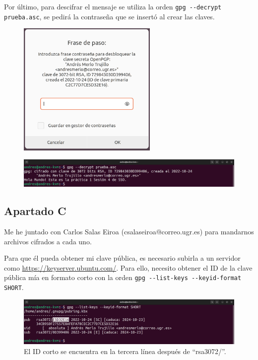 \documentclass{article}
\begin{document}
Por último, para descifrar el mensaje se utiliza la orden \verb|gpg --decrypt prueba.asc|, se pedirá la contraseña que se insertó al crear las claves.

\begin{figure}[H]
    \centering
    \includegraphics[width=0.6\textwidth]{imagenes/Portatil/Captura desde 2022-10-24 12-17-29.png}
\end{figure}

\begin{figure}[H]
    \includegraphics[width=\textwidth]{imagenes/Portatil/Captura desde 2022-10-27 18-35-01.png}
\end{figure}


\subsection*{Apartado C}

Me he juntado con Carlos Salas Eiroa (csalaseiroa@correo.ugr.es) para mandarnos archivos cifrados a cada uno.

Para que él pueda obtener mi clave pública, es necesario subirla a un servidor como \url{https://keyserver.ubuntu.com/}. Para ello, necesito obtener el ID de la clave pública mía en formato corto con la orden \verb|gpg --list-keys --keyid-format SHORT|.


\begin{figure}[H]
    \includegraphics[width=\textwidth]{imagenes/Portatil/Captura desde 2022-10-24 11-54-58.png}
    \caption{El ID corto se encuentra en la tercera línea después de ``rsa3072/''.}
\end{figure}
\end{document}
